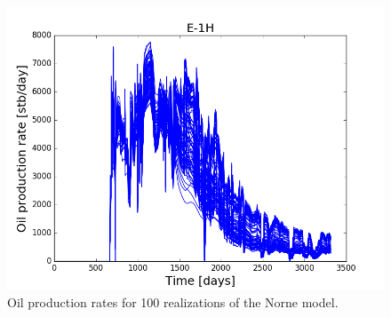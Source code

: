 \begin{figure}
  \centering
  \includegraphics[width=.6\textwidth]{figures/norne/norne_ensemble_wopr_e1h.png}
  \caption{ Oil production rates for 100 realizations of the Norne model. }
  \label{fig:norne_ensemble}
\end{figure}







